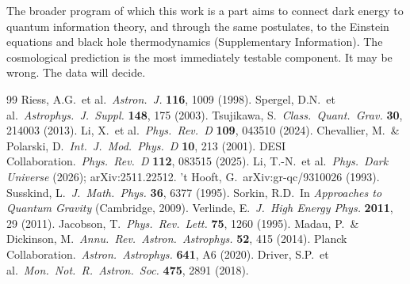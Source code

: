 \documentclass[12pt,a4paper]{article}
\begin{document}
The broader program of which this work is a part aims to connect dark energy to quantum information theory, and through the same postulates, to the Einstein equations and black hole thermodynamics (Supplementary Information). The cosmological prediction is the most immediately testable component. It may be wrong. The data will decide.

\begin{thebibliography}{99}
 Riess, A.G.\ et al.\ {\it Astron.\ J.} {\bf 116}, 1009 (1998).
 Spergel, D.N.\ et al.\ {\it Astrophys.\ J.\ Suppl.} {\bf 148}, 175 (2003).
 Tsujikawa, S.\ {\it Class.\ Quant.\ Grav.} {\bf 30}, 214003 (2013).
 Li, X.\ et al.\ {\it Phys.\ Rev.\ D} {\bf 109}, 043510 (2024).
 Chevallier, M.\ \& Polarski, D.\ {\it Int.\ J.\ Mod.\ Phys.\ D} {\bf 10}, 213 (2001).
 DESI Collaboration.\ {\it Phys.\ Rev.\ D} {\bf 112}, 083515 (2025).
 Li, T.-N.\ et al.\ {\it Phys.\ Dark Universe} (2026); arXiv:2511.22512.
 't Hooft, G.\ arXiv:gr-qc/9310026 (1993).
 Susskind, L.\ {\it J.\ Math.\ Phys.} {\bf 36}, 6377 (1995).
 Sorkin, R.D.\ In {\it Approaches to Quantum Gravity} (Cambridge, 2009).
 Verlinde, E.\ {\it J.\ High Energy Phys.} {\bf 2011}, 29 (2011).
 Jacobson, T.\ {\it Phys.\ Rev.\ Lett.} {\bf 75}, 1260 (1995).
 Madau, P.\ \& Dickinson, M.\ {\it Annu.\ Rev.\ Astron.\ Astrophys.} {\bf 52}, 415 (2014).
 Planck Collaboration.\ {\it Astron.\ Astrophys.} {\bf 641}, A6 (2020).
 Driver, S.P.\ et al.\ {\it Mon.\ Not.\ R.\ Astron.\ Soc.} {\bf 475}, 2891 (2018).
\end{thebibliography}
\end{document}
